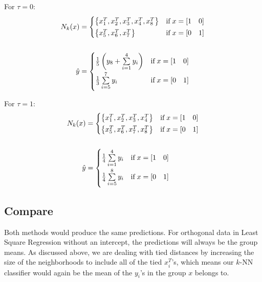 \documentclass[a4paper]{article}
\begin{document}
\begin{minipage}[t]{0.45\linewidth}
For $\tau=0$:
\begin{align*}
  N_k(x) &= 
    \begin{cases}
      \left\{x_1^T, x_2^T, x_3^T, x_4^T, x_8^T\right\} & 
        \text{if} \; x=[1 \quad 0]\vspace{2pt}\\
      \left\{x_5^T, x_6^T, x_7^T\right\} & 
        \text{if} \; x=[0 \quad 1]\\
    \end{cases}\\\\
  \hat{y} &=
  \begin{cases}
    \frac{1}{5}\left(y_8+\sum\limits_{i=1}^4 y_i\right) & 
        \text{if} \; x=[1 \quad 0]\vspace{2pt}\\
    \frac{1}{3}\sum\limits_{i=5}^7 y_i\vspace{2pt} & 
        \text{if} \; x=[0 \quad 1]\\
  \end{cases}
\end{align*}
\end{minipage}
\hfill
\vline
\hfill
\begin{minipage}[t]{0.45\linewidth}
For $\tau=1$:
\begin{align*}
  N_k(x)
  &= 
    \begin{cases}
      \left\{x_1^T, x_2^T, x_3^T, x_4^T\right\} & 
        \text{if} \; x=[1 \quad 0]\vspace{2pt}\\
      \left\{x_5^T, x_6^T, x_7^T, x_8^T\right\} & 
        \text{if} \; x=[0 \quad 1]\\
    \end{cases}\\\\
  \hat{y} &=
    \begin{cases}
    \frac{1}{4}\sum\limits_{i=1}^4 y_i & 
        \text{if} \; x=[1 \quad 0]\vspace{2pt}\\
    \frac{1}{4}\sum\limits_{i=5}^8 y_i\vspace{2pt} & 
        \text{if} \; x=[0 \quad 1]\\
  \end{cases}
\end{align*}
\end{minipage}

\subsection{Compare}
Both methods would produce the same predictions.  For orthogonal data
in Least Square Regression without an intercept, the predictions will
always be the group means.  As discussed above, we are dealing with
tied distances by increasing the size of the neighborhoods to include
all of the tied $x_i^T$'s, which means our $k$-NN classifier would again
be the mean of the $y_i$'s in the group $x$ belongs to.\\
\end{document}
